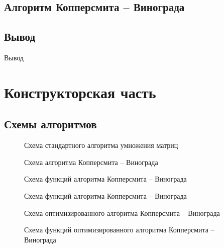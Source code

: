 \documentclass[12pt]{report}
\begin{document}
\section{Алгоритм Копперсмита -- Винограда}


\section{Вывод}
	Вывод
\clearpage

\chapter{Конструкторская часть}

\section{Схемы алгоритмов}


\begin{figure}[h]
	\centering
	\caption{Схема стандартного алгоритма умножения матриц}
	\label{fig:mpr}
\end{figure}

\begin{figure}[h]
	\centering
	\caption{Схема алгоритма Копперсмита -- Винограда}
	\label{fig:mpr}
\end{figure}

\begin{figure}[h]
	\centering
	\caption{Схема функций алгоритма Копперсмита -- Винограда}
	\label{fig:mpr}
\end{figure}

\begin{figure}[h]
	\centering
	\caption{Схема функций алгоритма Копперсмита -- Винограда}
	\label{fig:mpr}
\end{figure}

\begin{figure}[h]
	\centering
	\caption{Схема оптимизированного алгоритма Копперсмита -- Винограда}
	\label{fig:mpr}
\end{figure}

\begin{figure}[h]
	\centering
	\caption{Схема функций оптимизированного алгоритма Копперсмита -- Винограда}
	\label{fig:mpr}
\end{figure}
\end{document}
